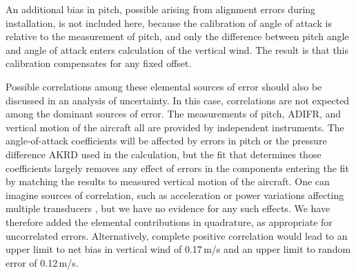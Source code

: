 \documentclass[12pt,twoside,english]{article}\usepackage[]{graphicx}\usepackage[]{color}
\begin{document}
An additional bias in pitch, possible arising from alignment errors during installation, is not included here, because the calibration of angle of attack is relative to the measurement of pitch, and only the difference between pitch angle and angle of attack enters calculation of the vertical wind. The result is that this calibration compensates for any fixed offset.

Possible correlations among these elemental sources of error should also be discussed in an analysis of uncertainty. In this case, correlations are not expected among the dominant sources of error. The measurements of pitch, ADIFR, and vertical motion of the aircraft all are provided by independent instruments. The angle-of-attack coefficients will be affected by errors in pitch or the pressure difference AKRD used in the calculation, but the fit that determines those coefficients largely removes any effect of errors in the components entering the fit by matching the results to measured vertical motion of the aircraft. One can imagine sources of correlation, such as acceleration or power variations affecting multiple transducers , but we have no evidence for any such effects. We have therefore added the elemental contributions in quadrature, as appropriate for uncorrelated errors. Alternatively, complete positive correlation would lead to an upper limit to net bias in vertical wind of 0.17\,m/s and an upper limit to random error of 0.12\,m/s. 

\end{document}
